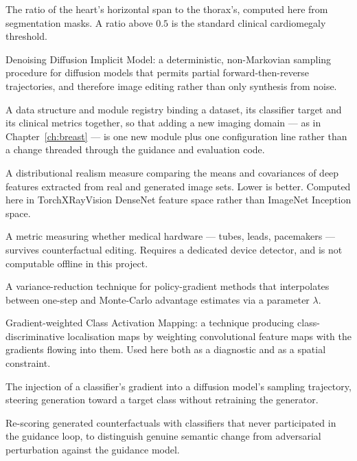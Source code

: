 \begin{description}[leftmargin=0pt,style=unboxed,itemsep=6pt]
\item[CTR (Cardio-Thoracic Ratio)] The ratio of the heart's horizontal
span to the thorax's, computed here from segmentation masks. A ratio
above $0.5$ is the standard clinical cardiomegaly threshold.

\item[DDIM] Denoising Diffusion Implicit Model: a deterministic,
non-Markovian sampling procedure for diffusion models that permits
partial forward-then-reverse trajectories, and therefore image editing
rather than only synthesis from noise.

\item[DomainProfile / domain registry] A data structure and module
registry binding a dataset, its classifier target and its clinical
metrics together, so that adding a new imaging domain --- as in
Chapter~\ref{ch:breast} --- is one new module plus one configuration line
rather than a change threaded through the guidance and evaluation code.

\item[FID (Fr\'echet Inception Distance)] A distributional realism
measure comparing the means and covariances of deep features extracted
from real and generated image sets. Lower is better. Computed here in
TorchXRayVision DenseNet feature space rather than ImageNet Inception
space.

\item[FOP (Foreign-Object Preservation)] A metric measuring whether
medical hardware --- tubes, leads, pacemakers --- survives counterfactual
editing. Requires a dedicated device detector, and is not computable
offline in this project.

\item[GAE (Generalized Advantage Estimation)] A variance-reduction
technique for policy-gradient methods that interpolates between one-step
and Monte-Carlo advantage estimates via a parameter $\lambda$.

\item[Grad-CAM] Gradient-weighted Class Activation Mapping: a technique
producing class-discriminative localisation maps by weighting
convolutional feature maps with the gradients flowing into them. Used
here both as a diagnostic and as a spatial constraint.

\item[Guidance] The injection of a classifier's gradient into a diffusion
model's sampling trajectory, steering generation toward a target class
without retraining the generator.

\item[Held-out validation] Re-scoring generated counterfactuals with
classifiers that never participated in the guidance loop, to distinguish
genuine semantic change from adversarial perturbation against the
guidance model.


\end{description}
